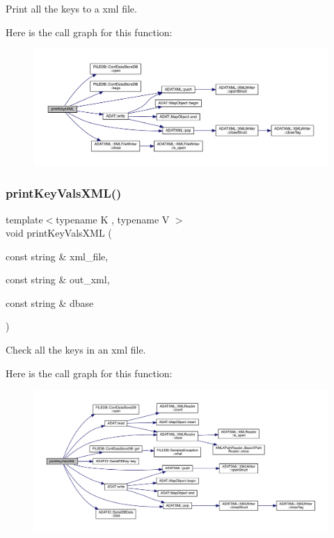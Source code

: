 Print all the keys to a xml file. 

Here is the call graph for this function\+:
\nopagebreak
\begin{figure}[H]
\begin{center}
\leavevmode
\includegraphics[width=350pt]{db/d54/adat-devel_2main_2dbutil_2dbdisco_8cc_a44428d59560cb466420c5c0ca60315e5_cgraph}
\end{center}
\end{figure}
\mbox{\label{adat-devel_2main_2dbutil_2dbdisco_8cc_a2a05b9e7e7b5e73b14c7c9fc65dd9122}} 
\subsubsection{\texorpdfstring{printKeyValsXML()}{printKeyValsXML()}}
{\footnotesize\ttfamily template$<$typename K , typename V $>$ \\
void print\+Key\+Vals\+X\+ML (\begin{DoxyParamCaption}\item[{const string \&}]{xml\+\_\+file,  }\item[{const string \&}]{out\+\_\+xml,  }\item[{const string \&}]{dbase }\end{DoxyParamCaption})}



Check all the keys in an xml file. 

Here is the call graph for this function\+:
\nopagebreak
\begin{figure}[H]
\begin{center}
\leavevmode
\includegraphics[width=350pt]{db/d54/adat-devel_2main_2dbutil_2dbdisco_8cc_a2a05b9e7e7b5e73b14c7c9fc65dd9122_cgraph}
\end{center}
\end{figure}
